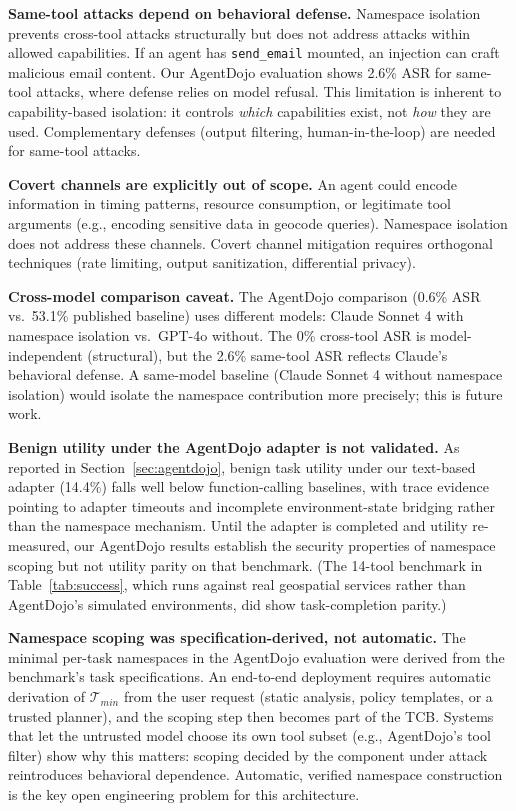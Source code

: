\documentclass{article}
\begin{document}
\textbf{Same-tool attacks depend on behavioral defense.} Namespace isolation prevents cross-tool attacks structurally but does not address attacks within allowed capabilities. If an agent has \texttt{send\_email} mounted, an injection can craft malicious email content. Our AgentDojo evaluation shows 2.6\% ASR for same-tool attacks, where defense relies on model refusal. This limitation is inherent to capability-based isolation: it controls \textit{which} capabilities exist, not \textit{how} they are used. Complementary defenses (output filtering, human-in-the-loop) are needed for same-tool attacks.

\textbf{Covert channels are explicitly out of scope.} An agent could encode information in timing patterns, resource consumption, or legitimate tool arguments (e.g., encoding sensitive data in geocode queries). Namespace isolation does not address these channels. Covert channel mitigation requires orthogonal techniques (rate limiting, output sanitization, differential privacy).

\textbf{Cross-model comparison caveat.} The AgentDojo comparison (0.6\% ASR vs.\ 53.1\% published baseline) uses different models: Claude Sonnet 4 with namespace isolation vs.\ GPT-4o without. The 0\% cross-tool ASR is model-independent (structural), but the 2.6\% same-tool ASR reflects Claude's behavioral defense. A same-model baseline (Claude Sonnet 4 without namespace isolation) would isolate the namespace contribution more precisely; this is future work.

\textbf{Benign utility under the AgentDojo adapter is not validated.} As reported in Section~\ref{sec:agentdojo}, benign task utility under our text-based adapter (14.4\%) falls well below function-calling baselines, with trace evidence pointing to adapter timeouts and incomplete environment-state bridging rather than the namespace mechanism. Until the adapter is completed and utility re-measured, our AgentDojo results establish the security properties of namespace scoping but not utility parity on that benchmark. (The 14-tool benchmark in Table~\ref{tab:success}, which runs against real geospatial services rather than AgentDojo's simulated environments, did show task-completion parity.)

\textbf{Namespace scoping was specification-derived, not automatic.} The minimal per-task namespaces in the AgentDojo evaluation were derived from the benchmark's task specifications. An end-to-end deployment requires automatic derivation of $\mathcal{T}_{min}$ from the user request (static analysis, policy templates, or a trusted planner), and the scoping step then becomes part of the TCB. Systems that let the untrusted model choose its own tool subset (e.g., AgentDojo's tool filter) show why this matters: scoping decided by the component under attack reintroduces behavioral dependence. Automatic, verified namespace construction is the key open engineering problem for this architecture.
\end{document}
